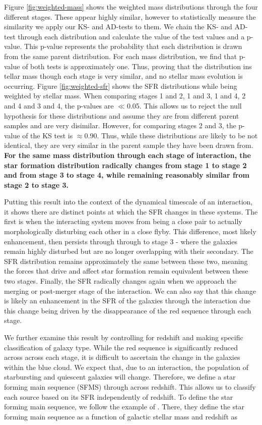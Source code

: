 Figure \ref{fig:weighted-mass} shows the weighted mass distributions through the four different stages. These appear highly similar, however to statistically measure the similarity we apply our KS- and AD-tests to them. We chain the KS- and AD- test through each distribution and calculate the value of the test values and a p-value. This p-value represents the probability that each distribution is drawn from the same parent distribution. For each mass distribution, we find that p-value of both tests is approximately one. Thus, proving that the distribution ins tellar mass though each stage is very similar, and no stellar mass evolution is occurring. Figure \ref{fig:weighted-sfr} shows the SFR distributions while being weighted by stellar mass. When comparing stages 1 and 2, 1 and 3, 1 and 4, 2 and 4 and 3 and 4, the p-values are $\ll$0.05. This allows us to reject the null hypothesis for these distributions and assume they are from different parent samples and are very disimilar. However, for comparing stages 2 and 3, the p-value of the KS test is $\approx$0.90. Thus, while these distributions are likely to be not identical, they are very similar in the parent sample they have been drawn from. \textbf{For the same mass distribution through each stage of interaction, the star formation distribution radically changes from stage 1 to stage 2 and from stage 3 to stage 4, while remaining reasonably similar from stage 2 to stage 3.}

Putting this result into the context of the dynamical timescale of an interaction, it shows there are distinct points at which the SFR changes in these systems. The first is when the interacting system moves from being a close pair to actually morphologically disturbing each other in a close flyby. This difference, most likely enhancement, then persists through through to stage 3 - where the galaxies remain highly disturbed but are no longer overlapping with their secondary. The SFR distribution remains approximately the same between these two, meaning the forces that drive and affect star formation remain equivalent between these two stages. Finally, the SFR radically changes again when we approach the merging or post-merger stage of the interaction. We can also say that this change is likely an enhancement in the SFR of the galaxies through the interaction due this change being driven by the disappearance of the red sequence through each stage.

We further examine this result by controlling for redshift and making specific classification of galaxy type. While the red sequence is significantly reduced across across each stage, it is difficult to ascertain the change in the galaxies within the blue cloud. We expect that, due to an interaction, the population of starbursting and quiescent galaxies will change. Therefore, we define a star forming main sequence (SFMS) through across redshift. This allows us to classify each source based on its SFR independently of redshift. To define the star forming main sequence, we follow the example of \citet{2019MNRAS.484.4360A}. There, they define the star forming main sequence as a function of galactic stellar mass and redshift as

